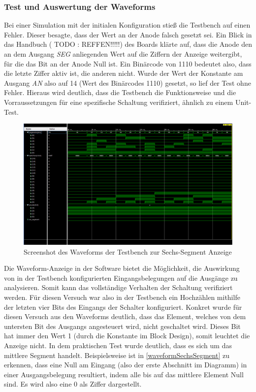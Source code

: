 \documentclass[11pt, a4paper]{article}
\begin{document}
\subsubsection*{Test und Auswertung der Waveforms}
Bei einer Simulation mit der initialen Konfiguration stieß die Testbench auf einen Fehler. Dieser besagte, dass der Wert an der Anode falsch gesetzt sei. Ein Blick in das Handbuch ( TODO : REFFEN!!!!!) des Boards klärte auf, dass die Anode den an dem Ausgang \textit{SEG} anliegenden Wert auf die Ziffern der Anzeige weitergibt, für die das Bit an der Anode Null ist. Ein Binärcode von 1110 bedeutet also, dass die letzte Ziffer aktiv ist, die anderen nicht.
Wurde der Wert der Konstante am Ausgang \textit{AN} also auf 14 (Wert des Binärcodes 1110) gesetzt, so lief der Test ohne Fehler.
Hieraus wird deutlich, dass die Testbench die Funktionsweise und die Vorraussetzungen für eine spezifische Schaltung verifiziert, ähnlich zu einem Unit-Test.
\begin{figure}[H]    
    \centering
    \includegraphics[width=\linewidth]{versuch1Data/waveform1.png}
    \caption{Screenshot des Waveforms der Testbench zur Sechs-Segment Anzeige}
    \label{waveformSechsSegment}        
\end{figure}
Die Waveform-Anzeige in der Software bietet die Möglichkeit, die Auswirkung von in der Testbench konfigurierten Eingangsbelegungen auf die Ausgänge zu analysieren. Somit kann das vollständige Verhalten der Schaltung verifiziert werden.
Für diesen Versuch war also in der Testbench ein Hochzählen mithilfe der letzten vier Bits des Eingangs der Schalter konfiguriert.
Konkret wurde für diesen Versuch aus den Waveforms deutlich, dass das Element, welches von dem untersten Bit des Ausgangs angesteuert wird, nicht geschaltet wird. Dieses Bit hat immer den Wert 1 (durch die Konstante im Block Design), somit leuchtet die Anzeige nicht. In dem praktischen Test wurde deutlich, dass es sich um das mittlere Segment handelt.
Beispielsweise ist in \autoref{waveformSechsSegment} zu erkennen, dass eine Null am Eingang (also der erste Abschnitt im Diagramm) in einer Ausgangsbelegung resultiert, indem alle bis auf das mittlere Element Null sind. Es wird also eine 0 als Ziffer dargestellt.
\end{document}
